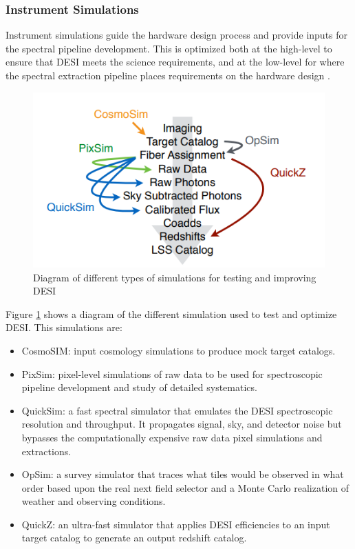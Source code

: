 \subsubsection{Instrument Simulations}
Instrument simulations guide the hardware design process and provide inputs for the spectral
pipeline development. This is optimized both at the high-level to ensure that DESI meets the science
requirements, and at the low-level for where the spectral extraction pipeline places requirements
on the hardware design \cite{Aghamousa:2016sne}. 
\begin{figure}[h!]
	\centering
	\includegraphics[width=1\linewidth]{TeX_files/Imagenes/desi_sim}
	\caption{Diagram of different types of simulations for testing and improving DESI \cite{Aghamousa:2016sne}}
	\label{fig:desisim}
\end{figure}
Figure \ref{fig:desisim} shows a diagram of the different simulation used to test and optimize DESI. This simulations are:
\begin{itemize}
	\item CosmoSIM: input cosmology simulations to produce mock target catalogs.
	\item PixSim: pixel-level simulations of raw data to be used for spectroscopic pipeline development and study of detailed systematics.
	\item QuickSim: a fast spectral simulator that emulates the DESI spectroscopic resolution and throughput. It propagates signal, sky, and detector noise but bypasses the computationally expensive raw data pixel simulations and extractions.
	\item OpSim: a survey simulator that traces what tiles would be observed in what order based upon the real next field selector and a Monte Carlo realization of weather and observing conditions.
	\item QuickZ: an ultra-fast simulator that applies DESI efficiencies to an input target catalog to generate an output redshift catalog.
\end{itemize}
